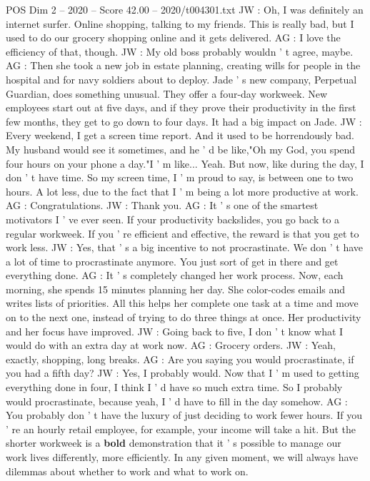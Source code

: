 \begin{textsample}{POS Dim 2 – 2020 – Score 42.00 – 2020/t004301.txt}
JW : Oh, I was definitely an internet surfer.
Online shopping, talking to my friends.
This is really bad, but I used to do our grocery shopping online and it gets delivered.
AG : I love the efficiency of that, though.
JW : My old boss probably wouldn ' t agree, maybe.
AG : Then she took a new job in estate planning, creating wills for people in the hospital and for navy soldiers about to deploy.
Jade ' s new company, Perpetual Guardian, does something unusual.
They offer a four-day workweek.
New employees start out at five days, and if they prove their productivity in the first few months, they get to go down to four days.
It had a big impact on Jade.
JW : Every weekend, I get a screen time report.
And it used to be horrendously bad.
My husband would see it sometimes, and he ' d be like,"Oh my God, you spend four hours on your phone a day."I ' m like...
Yeah.
But now, like during the day, I don ' t have time.
So my screen time, I ' m proud to say, is between one to two hours.
A lot less, due to the fact that I ' m being a lot more productive at work.
AG : Congratulations.
JW : Thank you.
AG : It ' s one of the smartest motivators I ' ve ever seen.
If your productivity backslides, you go back to a regular workweek.
If you ' re efficient and effective, the reward is that you get to work less.
JW : Yes, that ' s a big incentive to not procrastinate.
We don ' t have a lot of time to procrastinate anymore.
You just sort of get in there and get everything done.
AG : It ' s completely changed her work process.
Now, each morning, she spends 15 minutes planning her day.
She color-codes emails and writes lists of priorities.
All this helps her complete one task at a time and move on to the next one, instead of trying to do three things at once.
Her productivity and her focus have improved.
JW : Going back to five, I don ' t know what I would do with an extra day at work now.
AG : Grocery orders.
JW : Yeah, exactly, shopping, long breaks.
AG : Are you saying you would procrastinate, if you had a fifth day?
JW : Yes, I probably would.
Now that I ' m used to getting everything done in four, I think I ' d have so much extra time.
So I probably would procrastinate, because yeah, I ' d have to fill in the day somehow.
AG : You probably don ' t have the luxury of just deciding to work fewer hours.
If you ' re an hourly retail employee, for example, your income will take a hit.
But the shorter workweek is a \textbf{bold} demonstration that it ' s possible to manage our work lives differently, more efficiently.
In any given moment, we will always have dilemmas about whether to work and what to work on.

\end{textsample}
